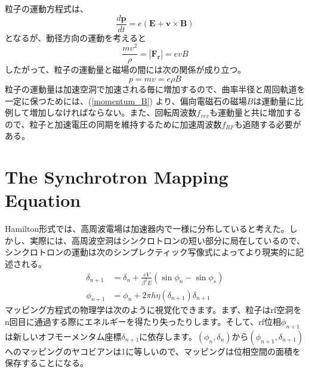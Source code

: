 \documentclass[]{jlreq}
\begin{document}
粒子の運動方程式は、
%
\begin{equation}
  \frac{d\bm{p}}{dt} = e (\bm{E} + \bm{v}\times \bm{B})
\end{equation}
%
となるが、動径方向の運動を考えると
%
\begin{equation}
  \frac{m v^2}{\rho} = |\bm{F_r}| = e v B
\end{equation}
%
したがって、粒子の運動量と磁場の間には次の関係が成り立つ。
%
\begin{equation}
  p = mv = e \rho B
  \label{momentum_B}
\end{equation}
%
粒子の運動量は加速空洞で加速される毎に増加するので、曲率半径と周回軌道を一定に保つためには、(\ref{momentum_B}) より、偏向電磁石の磁場$B$は運動量に比例して増加しなければならない。また、回転周波数$f_{rev}$も運動量と共に増加するので、粒子と加速電圧の同期を維持するために加速周波数$f_{RF}$も追随する必要がある。

\section{The Synchrotron Mapping Equation}
Hamilton形式では、高周波電場は加速器内で一様に分布していると考えた。しかし、実際には、高周波空洞はシンクロトロンの短い部分に局在しているので、シンクロトロンの運動は次のシンプレクティック写像式によってより現実的に記述される。
%
\begin{equation}
  \begin{split}
    \delta_{n+1} &= \delta_{n} + \frac{eV}{\beta^2 E}(\sin\phi_n - \sin\phi_s) \\
    \phi_{n+1} &= \phi_{n} + 2\pi h \eta(\delta_{n+1})\delta_{n+1}
  \end{split}
\end{equation}
%
マッピング方程式の物理学は次のように視覚化できます。まず、粒子はrf空洞をn回目に通過する際にエネルギーを得たり失ったりします。そして、rf位相$\phi_{n+1}$は新しいオフモーメンタム座標$\delta_{n+1}$に依存します。$(\phi_n, \delta_n)$から$(\phi_{n+1}, \delta_{n+1})$へのマッピングのヤコビアンは1に等しいので、マッピングは位相空間の面積を保存することになる。
\end{document}
